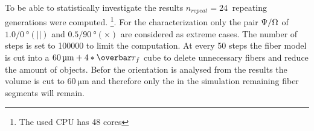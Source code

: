 % 
% 
To be able to statistically investigate the results $n_{\mathit{repeat}} = \SI{24}{}$ repeating generations were computed. \footnote{The used CPU has 48 cores}.
For the characterization only the pair $\textnormal{$\Psi$}/\textnormal{$\Omega$}$ of $1.0/\SI{0}{\degree} (||)$ and $0.5/\SI{90}{\degree} (\times)$ are considered as extreme cases.
The number of steps is set to \SI{100000}{} to limit the computation.
% 
At every 50 steps the fiber model is cut into a $\SI{60}{\micro\meter}+4*\fiberRadiusMean$ cube to delete unnecessary fibers and reduce the amount of objects.
Befor the orientation is analysed from the results the volume is cut to $\SI{60}{\micro\meter}$ and therefore only the in the simulation remaining fiber segments will remain.
% 
% 
% 
% 
% 
% 
